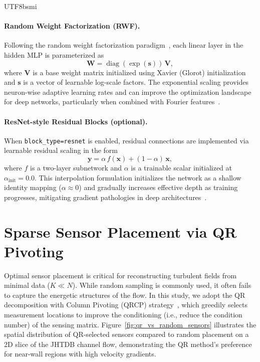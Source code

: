 \documentclass[master]{NTHUthesis}
\begin{document}
\begin{CJK*}{UTF8}{bsmi}
\paragraph{Random Weight Factorization (RWF).}
Following the random weight factorization paradigm~\cite{wang2022randomweightfactorizationimproves}, each linear layer in the hidden MLP is parameterized as
\begin{equation}
    \mathbf{W} = \operatorname{diag}(\exp(\mathbf{s}))\,\mathbf{V},
\end{equation}
where $\mathbf{V}$ is a base weight matrix initialized using Xavier (Glorot) initialization~\cite{pmlr-v9-glorot10a} and $\mathbf{s}$ is a vector of learnable log-scale factors. The exponential scaling provides neuron-wise adaptive learning rates and can improve the optimization landscape for deep networks, particularly when combined with Fourier features~\cite{wang2022randomweightfactorizationimproves}.

\paragraph{ResNet-style Residual Blocks (optional).}
When \texttt{block\_type=resnet} is enabled, residual connections are implemented via learnable residual scaling in the form
\begin{equation}
    \mathbf{y} = \alpha\,f(\mathbf{x}) + (1-\alpha)\,\mathbf{x},
\end{equation}
where $f$ is a two-layer subnetwork and $\alpha$ is a trainable scalar initialized at $\alpha_{\text{init}}=0.0$. This interpolation formulation initializes the network as a shallow identity mapping ($\alpha \approx 0$) and gradually increases effective depth as training progresses, mitigating gradient pathologies in deep architectures~\cite{Wang2024JMLR, wang2025simulatingthreedimensionalturbulencephysicsinformed}.

\section{Sparse Sensor Placement via QR Pivoting}
\label{sec:sensor_placement}
Optimal sensor placement is critical for reconstructing turbulent fields from minimal data ($K \ll N$). While random sampling is commonly used, it often fails to capture the energetic structures of the flow. In this study, we adopt the QR decomposition with Column Pivoting (QRCP) strategy~\cite{Manohar2018PNAS}, which greedily selects measurement locations to improve the conditioning (i.e., reduce the condition number) of the sensing matrix. Figure~\ref{fig:qr_vs_random_sensors} illustrates the spatial distribution of QR-selected sensors compared to random placement on a 2D slice of the JHTDB channel flow, demonstrating the QR method's preference for near-wall regions with high velocity gradients.


\end{CJK*}
\end{document}
